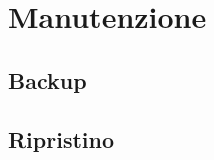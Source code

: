 \chapter{Manutenzione}
\label{Manutenzione}
\thispagestyle{empty}

\section{Backup}

\section{Ripristino}

